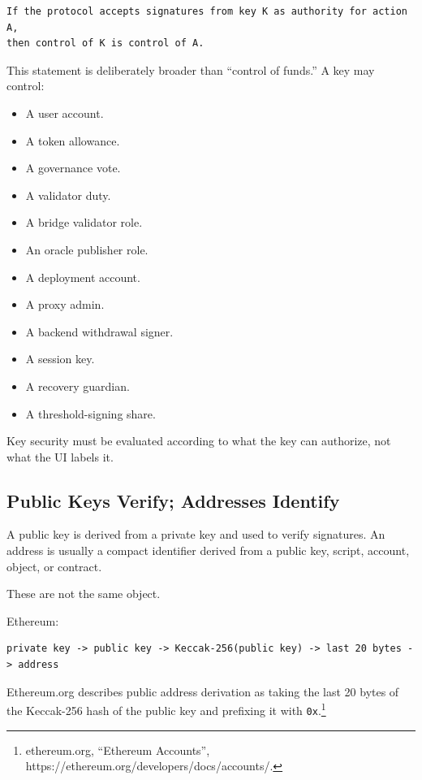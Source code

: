 \begin{lstlisting}
If the protocol accepts signatures from key K as authority for action A,
then control of K is control of A.
\end{lstlisting}

This statement is deliberately broader than ``control of funds.'' A key
may control:

\begin{itemize}
\tightlist
\item
  A user account.
\item
  A token allowance.
\item
  A governance vote.
\item
  A validator duty.
\item
  A bridge validator role.
\item
  An oracle publisher role.
\item
  A deployment account.
\item
  A proxy admin.
\item
  A backend withdrawal signer.
\item
  A session key.
\item
  A recovery guardian.
\item
  A threshold-signing share.
\end{itemize}

Key security must be evaluated according to what the key can authorize,
not what the UI labels it.

\subsection{Public Keys Verify; Addresses Identify}

A public key is derived from a private key and used to verify
signatures. An address is usually a compact identifier derived from a
public key, script, account, object, or contract.

These are not the same object.

Ethereum:

\begin{lstlisting}
private key -> public key -> Keccak-256(public key) -> last 20 bytes -> address
\end{lstlisting}

Ethereum.org describes public address derivation as taking the last 20
bytes of the Keccak-256 hash of the public key and prefixing it with
\passthrough{\lstinline!0x!}.\footnote{ethereum.org, ``Ethereum
  Accounts'', https://ethereum.org/developers/docs/accounts/.}

